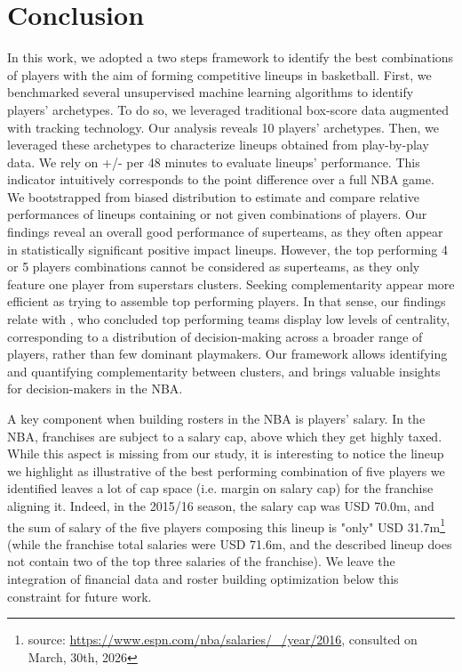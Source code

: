 \section{Conclusion}
\label{sec:ccl}

In this work, we adopted a two steps framework to identify the best combinations of players with the aim of forming competitive lineups in basketball.
First, we benchmarked several unsupervised machine learning algorithms to identify players' archetypes. 
To do so, we leveraged traditional box-score data augmented with tracking technology. 
Our analysis reveals 10 players' archetypes.
Then, we leveraged these archetypes to characterize lineups obtained from play-by-play data.
We rely on +/- per 48 minutes to evaluate lineups' performance. 
This indicator intuitively corresponds to the point difference over a full NBA game.
We bootstrapped from biased distribution to estimate and compare relative performances of lineups containing or not given combinations of players.
Our findings reveal an overall good performance of superteams, as they often appear in statistically significant positive impact lineups.
However, the top performing 4 or 5 players combinations cannot be considered as superteams, as they only feature one player from superstars clusters.
Seeking complementarity appear more efficient as trying to assemble top performing players.
In that sense, our findings relate with \cite{Fewell2012basketball}, who concluded top performing teams display low levels of centrality, corresponding to a distribution of decision-making across a broader range of players, rather than few dominant playmakers. 
Our framework allows identifying and quantifying complementarity between clusters, and brings valuable insights for decision-makers in the NBA.  

A key component when building rosters in the NBA is players' salary. 
In the NBA, franchises are subject to a salary cap, above which they get highly taxed.  
While this aspect is missing from our study, it is interesting to notice the lineup we highlight as illustrative of the best performing combination of five players we identified leaves a lot of cap space (i.e. margin on salary cap) for the franchise aligning it.
Indeed, in the 2015/16 season, the salary cap was USD 70.0m, and the sum of salary of the five players composing this lineup is "only" USD 31.7m\footnote{source: \url{https://www.espn.com/nba/salaries/_/year/2016}, consulted on March, 30th, 2026} (while the franchise total salaries were USD 71.6m, and the described lineup does not contain two of the top three salaries of the franchise). 
We leave the integration of financial data and roster building optimization below this constraint for future work.

